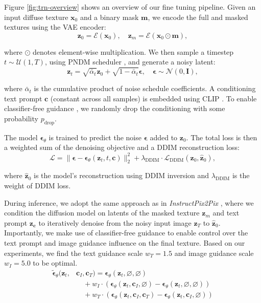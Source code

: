 \documentclass[11pt,twocolumn]{article}
\begin{document}
Figure \ref{fig:trn-overview} shows an overview of our fine tuning pipeline. Given an input diffuse texture $\mathbf{x}_0$ and a binary mask $\mathbf{m}$, we encode the full and masked textures using the VAE encoder:
$$
\mathbf{z}_0 = \mathcal{E}(\mathbf{x}_0), \quad \mathbf{z}_m = \mathcal{E}(\mathbf{x}_0 \odot \mathbf{m}),
$$

where $\odot$ denotes element-wise multiplication. We then sample a timestep $t \sim \mathcal{U}(1, T)$, using PNDM scheduler \cite{pndm}, and generate a noisy latent:
\vspace{0.0em}
$$
\mathbf{z}_t = \sqrt{\bar{\alpha}_t} \mathbf{z}_0 + \sqrt{1 - \bar{\alpha}_t} \boldsymbol{\epsilon}, \quad \boldsymbol{\epsilon} \sim \mathcal{N}(0, \mathbf{I}),
$$

where $\bar{\alpha}_t$ is the cumulative product of noise schedule coefficients. A conditioning text prompt $\mathbf{c}$ (constant across all samples) is embedded using CLIP \cite{clip}. To enable classifier-free guidance \cite{cfg}, we randomly drop the conditioning with some probability $p_{\text{drop}}$.

The model $\boldsymbol{\epsilon}_\theta$ is trained to predict the noise $\boldsymbol{\epsilon}$ added to $\mathbf{z}_0$. The total loss is then a weighted sum of the denoising objective and a DDIM reconstruction loss:
$$
\mathcal{L} = \|\boldsymbol{\epsilon} - \boldsymbol{\epsilon}_\theta(\mathbf{z}_t, t, \mathbf{c})\|_2^2 + \lambda_{\text{DDIM}} \cdot \mathcal{L}_{\text{DDIM}}(\mathbf{z}_0, \hat{\mathbf{z}}_0),
$$

where $\hat{\mathbf{z}}_0$ is the model's reconstruction using DDIM inversion \cite{ddim} and $\lambda_{\text{DDIM}}$ is the weight of DDIM loss.

During inference, we adopt the same approach as in \textit{InstructPix2Pix} \cite{instructpix2pix}, 
where we condition the diffusion model on latents of the masked texture $\mathbf{z}_m$ and text prompt 
$\mathbf{z_c}$ to iteratively denoise from the noisy input image $\mathbf{z}_T$ to $\hat{\mathbf{z}}_0$. 
Importantly, we make use of classifier-free guidance \cite{cfg} to enable control over the text prompt and 
image guidance influence on the final texture. Based on our experiments, we find the text guidance scale $w_T = 1.5$ 
and image guidance scale $w_I = 5.0$ to be optimal.
\vspace{0.0em}
\begin{align*}
  \tilde{\boldsymbol{\epsilon}}_{\theta}(\mathbf{z}_t, &\mathbf{c}_I, \mathbf{c}_T) = \boldsymbol{\epsilon}_{\theta}(\mathbf{z}_t, \varnothing, \varnothing) \\
  &\quad + w_I \cdot \left( \boldsymbol{\epsilon}_{\theta}(\mathbf{z}_t, \mathbf{c}_I, \varnothing) - \boldsymbol{\epsilon}_{\theta}(\mathbf{z}_t, \varnothing, \varnothing) \right) \\
  &\quad + w_T \cdot \left( \boldsymbol{\epsilon}_{\theta}(\mathbf{z}_t, \mathbf{c}_I, \mathbf{c}_T) - \boldsymbol{\epsilon}_{\theta}(\mathbf{z}_t, \mathbf{c}_I, \varnothing) \right)
\end{align*}
\end{document}
